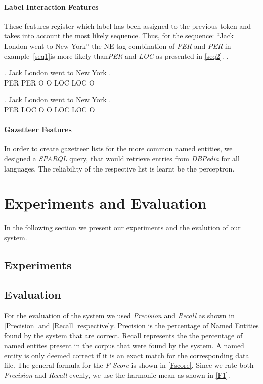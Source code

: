 \documentclass[11pt]{article}
\begin{document}
\paragraph*{Label Interaction Features}
These features register which label has been assigned to the previous token and takes into account the most likely sequence. 
Thus, for the sequence: ``Jack London went to New York'' the NE tag combination of \emph{PER} and \emph{PER} in example~\ref{seq1}is more likely 
than\emph{PER} and \emph{LOC} as presented in \ref{seq2}.
.

\exg. Jack London went to New York .\\
      PER   PER   O    O  LOC LOC  O \\\label{seq1}

\exg. Jack London went to New York . \\ 
      PER  LOC    O    O  LOC LOC O \\\label{seq2}
    

\paragraph*{Gazetteer Features}
In order to create gazetteer lists for the more common named entities, we designed a \emph{SPARQL} query, that would retrieve entries from \emph{DBPedia} for all
languages. The reliability of the respective list is learnt be the perceptron. 


\section{Experiments and Evaluation}
In the following section we present our experiments and the evalution of our system.
\subsection*{Experiments}


\subsection*{Evaluation}
For the evaluation of the system we used \emph{Precision} and \emph{Recall} as shown in \ref{Precision} and \ref{Recall} respectively.
Precision is the percentage of Named Entities found by the system that are correct. Recall represents the the percentage of 
named entites present in the corpus that were found by the system. 
A named entity is only deemed correct if it is an exact match for the corresponding data file.
The general formula for the \emph{F-Score} is shown in \ref{Fscore}. Since we rate both \emph{Precision} and \emph{Recall} evenly, we 
use the harmonic mean as shown in \ref{F1}.
\end{document}
